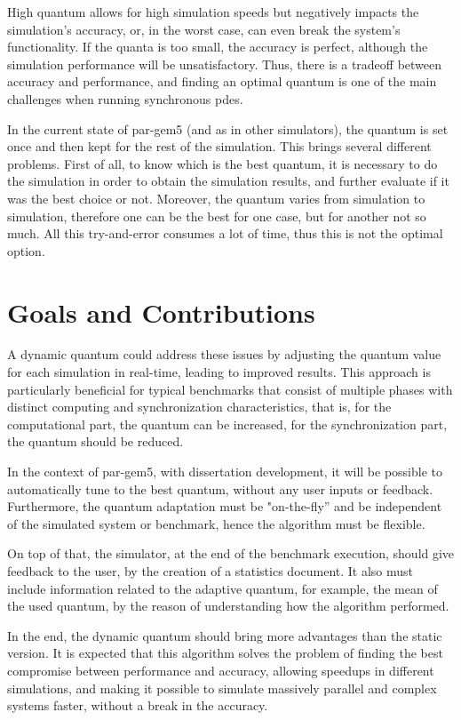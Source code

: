 High quantum allows for high simulation speeds but negatively impacts the simulation's accuracy, or, in the worst case, can even break the system's 
functionality. If the quanta is too small, the accuracy is perfect, although the simulation performance will be unsatisfactory. Thus, there is a 
tradeoff between accuracy and performance, and finding an optimal quantum is one of the main challenges when running synchronous \gls{pdes}.

In the current state of par-gem5 (and as in other simulators), the quantum is set once and then kept for the rest of the simulation. This brings 
several different problems. First of all, to know which is the best quantum, it is necessary to do the simulation in order to obtain the simulation 
results, and further evaluate if it was the best choice or not. Moreover, the quantum varies from simulation to simulation, therefore one can be the 
best for one case, but for another not so much. All this try-and-error consumes a lot of time, thus this is not the optimal option. 

\section{Goals and Contributions}

A dynamic quantum could address these issues by adjusting the quantum value for each simulation in real-time, leading to improved results. 
This approach is particularly beneficial for typical benchmarks that consist of multiple phases with distinct computing and synchronization 
characteristics, that is, for the computational part, the quantum can be increased, for the synchronization part, the quantum should be reduced. 

In the context of par-gem5, with dissertation development, it will be possible to automatically tune to the best quantum, without any user inputs or 
feedback. Furthermore, the quantum adaptation must be "on-the-fly” and be independent of the simulated system or benchmark, hence the algorithm 
must be flexible. 

On top of that, the simulator, at the end of the benchmark execution, should give feedback to the user, by the creation of a statistics document. 
It also must include information related to the adaptive quantum, for example, the mean of the used quantum, by the reason of understanding how 
the algorithm performed.

 In the end, the dynamic quantum should bring more advantages than the static version. It is expected that this algorithm solves the problem of 
 finding the best compromise between performance and accuracy, allowing speedups in different simulations, and making it possible to simulate 
 massively parallel and complex systems faster, without a break in the accuracy. 

